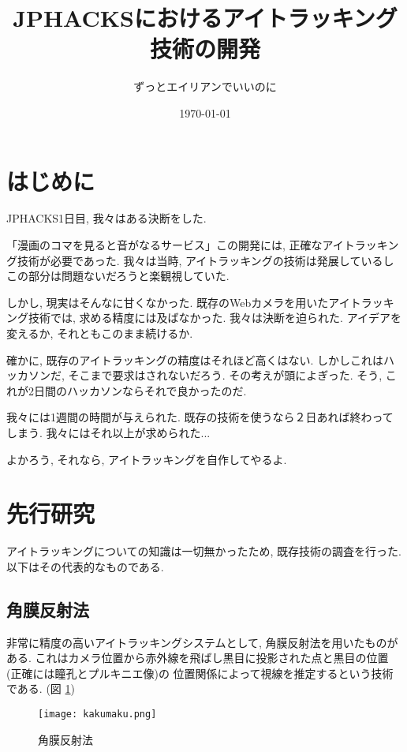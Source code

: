 \documentclass[a4paper,11pt]{jsarticle}
\begin{document}
\title{JPHACKSにおけるアイトラッキング技術の開発}
\author{ずっとエイリアンでいいのに}
\date{\today}
\maketitle

\section{はじめに}
JPHACKS1日目, 我々はある決断をした.

「漫画のコマを見ると音がなるサービス」この開発には, 正確なアイトラッキング技術が必要であった.
我々は当時, アイトラッキングの技術は発展しているしこの部分は問題ないだろうと楽観視していた.

しかし, 現実はそんなに甘くなかった.
既存のWebカメラを用いたアイトラッキング技術では, 求める精度には及ばなかった.
我々は決断を迫られた.
アイデアを変えるか, それともこのまま続けるか.

確かに, 既存のアイトラッキングの精度はそれほど高くはない.
しかしこれはハッカソンだ, そこまで要求はされないだろう.
その考えが頭によぎった.
そう, これが2日間のハッカソンならそれで良かったのだ.

我々には1週間の時間が与えられた.
既存の技術を使うなら２日あれば終わってしまう.
我々にはそれ以上が求められた...

よかろう, それなら, アイトラッキングを自作してやるよ.

\section{先行研究}
アイトラッキングについての知識は一切無かったため, 既存技術の調査を行った. 以下はその代表的なものである.
\subsection{角膜反射法}
非常に精度の高いアイトラッキングシステムとして, 角膜反射法を用いたものがある.
これはカメラ位置から赤外線を飛ばし黒目に投影された点と黒目の位置 (正確には瞳孔とプルキニエ像)の
位置関係によって視線を推定するという技術である. (図 \ref{fig:kakumaku})

\begin{figure}
  \begin{center}
    \texttt{[image: kakumaku.png]}
    \caption{角膜反射法}
    \label{fig:kakumaku}
  \end{center}
\end{figure}
\end{document}
